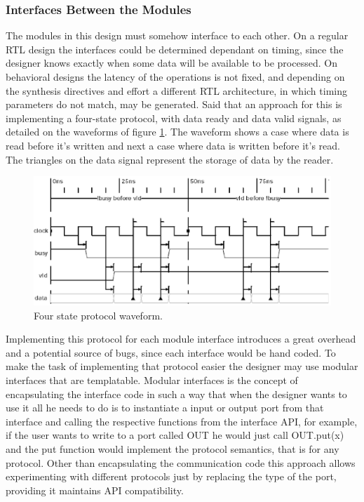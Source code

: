 \documentclass[a4paper, 12pt]{article}
\begin{document}
\subsubsection{Interfaces Between the Modules}

	The modules in this design must somehow interface to each other. On a regular RTL design the interfaces could be determined dependant on timing, since the designer knows exactly when some data will be available to be processed. On behavioral designs the latency of the operations is not fixed, and depending on the synthesis directives and effort a different RTL architecture, in which timing parameters do not match, may be generated. Said that an approach for this is implementing a four-state protocol, with data ready and data valid signals, as detailed on the waveforms of figure \ref{fig:protocol}.
The waveform shows a case where data is read before it's written and next a case where data is written before it's read. The triangles on the data signal represent the storage of data by the reader. 
\begin{figure}[h]
\centering
\includegraphics[width=15cm]{figs/p2pprotocol.eps}
\caption{Four state protocol waveform. }
\label{fig:protocol}
\end{figure}

	Implementing this protocol for each module interface introduces a great overhead and a potential source of bugs, since each interface would be hand coded. To make the task of implementing that protocol easier the designer may use modular interfaces that are templatable. Modular interfaces is the concept of encapsulating the interface code in such a way that when the designer wants to use it all he needs to do is to instantiate a input or output port from that interface and calling the respective functions from the interface API, for example, if the user wants to write to a port called OUT he would just call OUT.put(x) and the put function would implement the protocol semantics, that is for any protocol. Other than encapsulating the communication code this approach allows experimenting with different protocols just by replacing the type of the port, providing it maintains API compatibility. 
\end{document}
